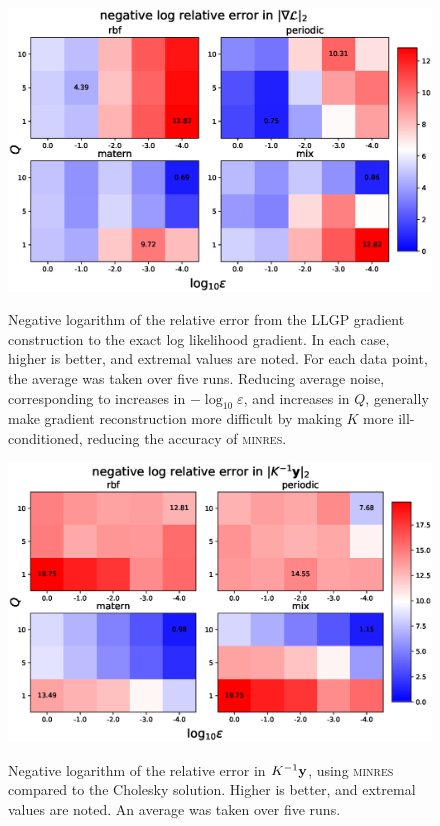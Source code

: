 \documentclass{article}
\begin{document}
\begin{figure}[!h]
  \centering
{\includegraphics[width=\textwidth]{relgrad_l2.eps}}
\caption{Negative logarithm of the relative error from the LLGP gradient construction to the exact log likelihood gradient. In each case, higher is better, and extremal values are noted.  For each data point, the average was taken over five runs. Reducing average noise, corresponding to increases in $-\log_{10}\varepsilon$, and increases in $Q$, generally make gradient reconstruction more difficult by making $K$ more ill-conditioned, reducing the accuracy of \textsc{minres}.}
\label{fig:relgrad}
\end{figure}

\begin{figure}[!h]
\centering
{\includegraphics[width=\textwidth]{relalpha_l2.eps}}
\caption{Negative logarithm of the relative error in $K^{-1}\textbf{y}$, using \textsc{minres} compared to the Cholesky solution. Higher is better, and extremal values are noted. An average was taken over five runs.}
\label{fig:rellog}
\end{figure}




\end{document}

